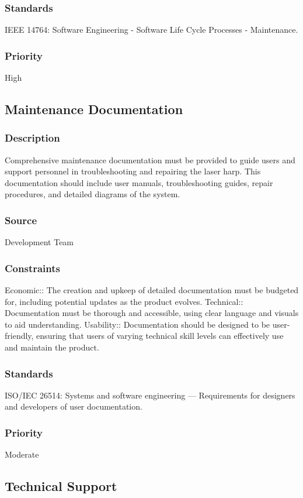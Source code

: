 \subsubsection{Standards}
IEEE 14764: Software Engineering - Software Life Cycle Processes - Maintenance.
\subsubsection{Priority}
High


\subsection{Maintenance Documentation}
\subsubsection{Description}
Comprehensive maintenance documentation must be provided to guide users and support personnel in troubleshooting and repairing the laser harp. This documentation should include user manuals, troubleshooting guides, repair procedures, and detailed diagrams of the system.
\subsubsection{Source}
Development Team
\subsubsection{Constraints}
Economic:: The creation and upkeep of detailed documentation must be budgeted for, including potential updates as the product evolves.
Technical:: Documentation must be thorough and accessible, using clear language and visuals to aid understanding.
Usability:: Documentation should be designed to be user-friendly, ensuring that users of varying technical skill levels can effectively use and maintain the product.
\subsubsection{Standards}
ISO/IEC 26514: Systems and software engineering — Requirements for designers and developers of user documentation.
\subsubsection{Priority}
Moderate


\subsection{Technical Support}
